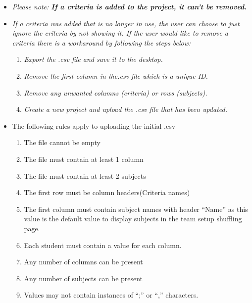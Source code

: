 \begin{itemize}
	\item[] \textit{Please note: \textbf{If a criteria is added to the project, it can't be removed.}}
	\item[] \textit{If a criteria was added that is no longer in use, the user can choose to just ignore the criteria by not showing it. If the user would like to remove a criteria there is a workaround by following the steps below:}
	\begin{enumerate}
		\item \textit{Export the .csv file and save it to the desktop.}
		\item \textit{Remove the first column in the.csv file which is a unique ID.}
		\item \textit{Remove any unwanted columns (criteria) or rows (subjects).}
		\item \textit{Create a new project and upload the .csv file that has been updated.}
	\end{enumerate}
	\item The following rules apply to uploading the initial .csv
	\begin{enumerate}
		\item The file cannot be empty
		\item The file must contain at least 1 column
		\item The file must contain at least 2 subjects
		\item The first row must be column headers(Criteria names)
		\item The first column must contain subject names with header ``Name'' as this value is the default value to display subjects in the team setup shuffling page.
		\item Each student must contain a value for each column.
		\item Any number of columns can be present
		\item Any number of subjects can be present
		\item Values may not contain instances of ``;'' or ``,'' characters.
						

\end{enumerate}
\end{itemize}
